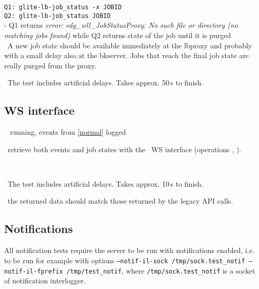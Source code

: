 {\tt Q1: glite-lb-job\_status -x JOBID } \\
{\tt Q2: glite-lb-job\_status JOBID } \\
- Q1 returns {\em error: edg\_wll\_JobStatusProxy: No such file or directory (no matching jobs found)} while Q2 returns state of the job until it is purged \\

\result\ A new job state should be available immediately at the
lbproxy and probably with a small delay also at the bkserver. Jobs that reach the final job state
are really purged from the proxy.

\note\ The test includes artificial delays. Takes approx. 50\,s to finish.


\subsection{WS interface}
\req\  running, events from \ref{normal} logged

\what\ retrieve both events and job states with the \LB\ WS interface
(operations , ).

\how\ 

\note\ The test includes artificial delays. Takes approx. 10\,s to finish.

\result\ the returned data should match those returned by the legacy API calls.











\subsection{Notifications}

All notification tests require the \LB server to be run with notifications enabled,
i.e. to be run for example with options 
\texttt{--notif-il-sock /tmp/sock.test\_notif --notif-il-fprefix /tmp/test\_notif}, 
where \texttt{/tmp/sock.test\_notif} is a socket of notification interlogger.

